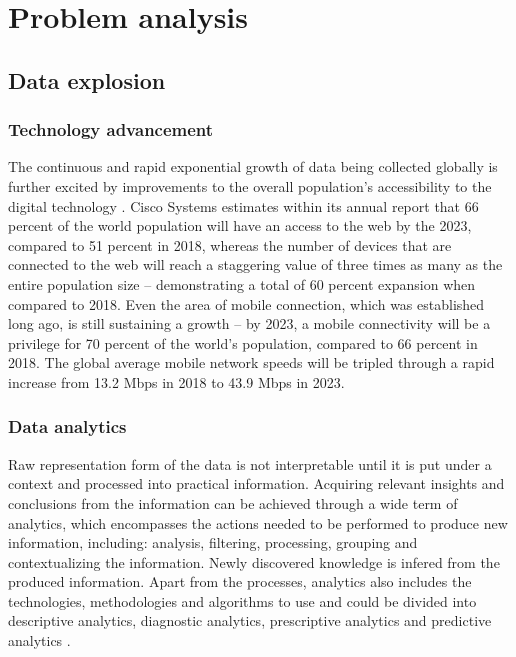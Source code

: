 \documentclass[a4paper,twoside,12pt]{book}
\begin{document}
\chapter{Problem analysis}


\section{Data explosion}

\subsection{Technology advancement}
The continuous and rapid exponential growth of data being collected globally is further excited by improvements to the overall population's accessibility to the digital technology \cite{bib:big_data_analytics}. Cisco Systems estimates within its annual report \cite{bib:cisco_annual} that 66 percent of the world population will have an access to the web by the 2023, compared to 51 percent in 2018, whereas the number of devices that are connected to the web will reach a staggering value of three times as many as the entire population size – demonstrating a total of 60 percent expansion when compared to 2018. Even the area of mobile connection, which was established long ago, is still sustaining a growth – by 2023, a mobile connectivity will be a privilege for 70 percent of the world's population, compared to 66 percent in 2018. The global average mobile network speeds will be tripled through a rapid increase from 13.2 Mbps in 2018 to 43.9 Mbps in 2023.

\subsection{Data analytics}
Raw representation form of the data is not interpretable until it is put under a context and processed into practical information.
Acquiring relevant insights and conclusions from the information can be achieved through a wide term of analytics, which encompasses the actions needed to be performed to produce new information, including: analysis, filtering, processing, grouping and contextualizing the information. Newly discovered knowledge is infered from the produced information.
Apart from the processes, analytics also includes the technologies, methodologies and algorithms to use and could be divided into descriptive analytics, diagnostic analytics, prescriptive analytics and predictive analytics \cite{bib:big_data_analytics}.
\end{document}
